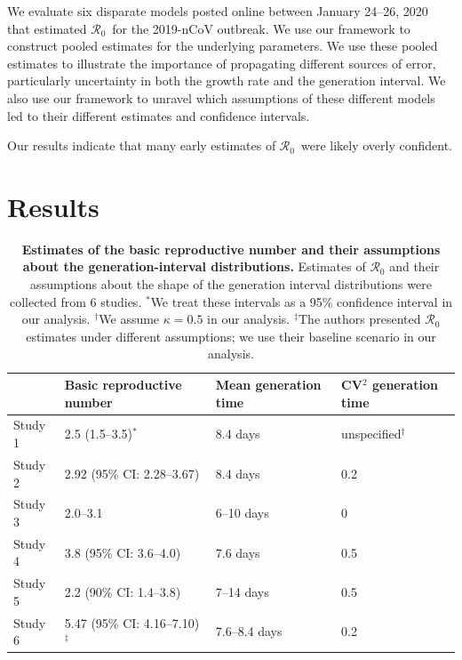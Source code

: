 \documentclass[12pt]{article}
\newcommand{\Rx}[1]{\ensuremath{{\mathcal R}_{#1}}}
\newcommand{\Ro}{\Rx{0}}
\begin{document}
We evaluate six disparate models posted online between January 24--26, 2020 that estimated \Ro\ for the 2019-nCoV outbreak. We use our framework to construct pooled estimates for the underlying parameters. We use these pooled estimates to illustrate the importance of propagating different sources of error, particularly uncertainty in both the growth rate and the generation interval. We also use our framework to unravel which assumptions of these different models led to their different estimates and confidence intervals.

Our results indicate that many early estimates of \Ro\ were likely overly confident.

\section{Results}

\begin{table}[t]
\begin{center}
\footnotesize
\begin{tabular}{l|l|l|l}
 & Basic reproductive number & Mean generation time & CV$^2$ generation time \\
\hline
Study 1 & 2.5 (1.5--3.5)$^\ast$ & 8.4 days & unspecified$^\dagger$ \\
\hline
Study 2 & 2.92 (95\% CI: 2.28--3.67) & 8.4 days & 0.2 \\
\hline
Study 3 & 2.0--3.1 & 6--10 days & 0 \\
\hline
Study 4 & 3.8 (95\% CI: 3.6--4.0) & 7.6 days & 0.5 \\
\hline
Study 5 & 2.2 (90\% CI: 1.4--3.8) & 7--14 days & 0.5\\
\hline
Study 6 & 5.47 (95\% CI: 4.16--7.10)$^\ddagger$ & 7.6--8.4 days & 0.2\\
\hline
\end{tabular}
\end{center}
\caption{
\textbf{Estimates of the basic reproductive number and their assumptions about the generation-interval distributions.}
Estimates of $\mathcal R_0$ and their assumptions about the shape of the generation interval distributions were collected from 6 studies.
$^\ast$We treat these intervals as a 95\% confidence interval in our analysis.
$^\dagger$We assume $\kappa = 0.5$ in our analysis.
$^\ddagger$The authors presented $\mathcal R_0$ estimates under different assumptions; we use their baseline scenario in our analysis.
}
\end{table}
\end{document}
